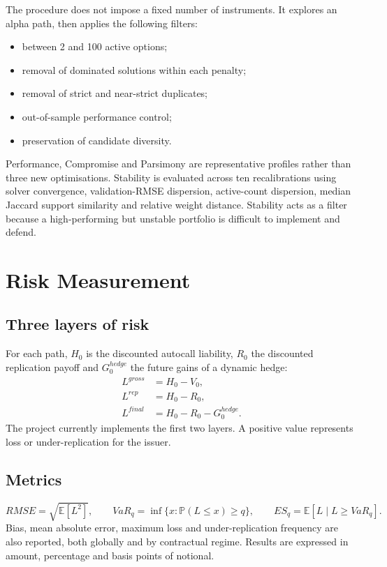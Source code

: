 \documentclass[11pt,a4paper]{article}
\begin{document}
The procedure does not impose a fixed number of instruments. It explores an alpha path, then applies the following filters:

\begin{itemize}
\item between 2 and 100 active options;
\item removal of dominated solutions within each penalty;
\item removal of strict and near-strict duplicates;
\item out-of-sample performance control;
\item preservation of candidate diversity.
\end{itemize}

Performance, Compromise and Parsimony are representative profiles rather than three new optimisations. Stability is evaluated across ten recalibrations using solver convergence, validation-RMSE dispersion, active-count dispersion, median Jaccard support similarity and relative weight distance. Stability acts as a filter because a high-performing but unstable portfolio is difficult to implement and defend.

\section{Risk Measurement}

\subsection{Three layers of risk}

For each path, $H_0$ is the discounted autocall liability, $R_0$ the discounted replication payoff and $G_0^{hedge}$ the future gains of a dynamic hedge:
\begin{align*}
L^{gross}&=H_0-V_0,\\
L^{rep}&=H_0-R_0,\\
L^{final}&=H_0-R_0-G_0^{hedge}.
\end{align*}
The project currently implements the first two layers. A positive value represents loss or under-replication for the issuer.

\subsection{Metrics}

\[
RMSE=\sqrt{\mathbb{E}[L^2]},\qquad
VaR_q=\inf\{x:\mathbb{P}(L\leq x)\geq q\},
\qquad
ES_q=\mathbb{E}[L\mid L\geq VaR_q].
\]
Bias, mean absolute error, maximum loss and under-replication frequency are also reported, both globally and by contractual regime. Results are expressed in amount, percentage and basis points of notional.
\end{document}
